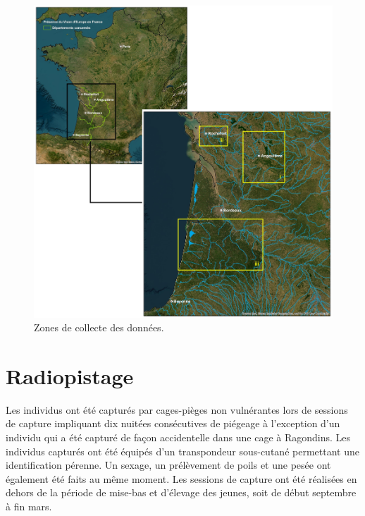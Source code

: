 \documentclass[
  letterpaper,
  DIV=11,
  numbers=noendperiod]{scrreprt}
\begin{document}
\begin{figure}[H]

{\centering \includegraphics{image/zones_etudes.jpg}

}

\caption{Zones de collecte des données.}

\end{figure}%

\section{Radiopistage}\label{radiopistage}

Les individus ont été capturés par cages-pièges non vulnérantes lors de
sessions de capture impliquant dix nuitées consécutives de piégeage à
l'exception d'un individu qui a été capturé de façon accidentelle dans
une cage à Ragondins. Les individus capturés ont été équipés d'un
transpondeur sous-cutané permettant une identification pérenne. Un
sexage, un prélèvement de poils et une pesée ont également été faits au
même moment. Les sessions de capture ont été réalisées en dehors de la
période de mise-bas et d'élevage des jeunes, soit de début septembre à
fin mars.
\end{document}
